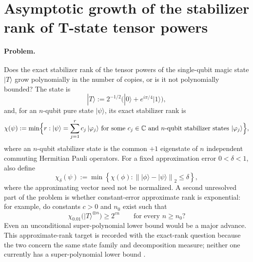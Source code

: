 \section{Asymptotic growth of the stabilizer rank of T-state tensor powers}
\label{sec:op_37f7b003ec78a028}

\paragraph{Problem.}
Does the exact stabilizer rank of the tensor powers of the single-qubit
magic state $|T\rangle$ grow polynomially in the number of copies, or is
it not polynomially bounded?  The state is
\begin{equation}
  |T\rangle := 2^{-1/2}\bigl(|0\rangle + e^{i\pi/4}|1\rangle\bigr),
  \label{eq:srtk-t-state}
\end{equation}
and, for an $n$-qubit pure state $|\psi\rangle$, its exact stabilizer rank
is
\begin{equation}
  \chi(\psi) := \min\Bigl\{r : |\psi\rangle = \sum_{j=1}^{r} c_j\,|\varphi_j\rangle
  \text{ for some } c_j \in \mathbb{C} \text{ and } n\text{-qubit stabilizer states }
  |\varphi_j\rangle\Bigr\},
  \label{eq:srtk-rank-def}
\end{equation}
where an $n$-qubit stabilizer state is the common $+1$ eigenstate of $n$
independent commuting Hermitian Pauli operators.  For a fixed approximation error $0<\delta<1$, also define
\begin{equation}
  \chi_\delta(\psi):=\min\left\{\chi(\phi):
  \left\lVert |\phi\rangle-|\psi\rangle\right\rVert_2\leq\delta\right\},
  \label{eq:srtk-approx-def}
\end{equation}
where the approximating vector need not be normalized. A second unresolved
part of the problem is whether constant-error approximate rank is
exponential: for example, do constants $c>0$ and $n_0$ exist such that
\begin{equation}
  \chi_{0.01}\bigl(|T\rangle^{\otimes n}\bigr)\geq 2^{cn}
  \qquad\text{for every }n\geq n_0?
  \label{eq:srtk-approx-exp}
\end{equation}
Even an unconditional super-polynomial lower bound would be a major advance.
This approximate-rank target is recorded with the exact-rank question because
the two concern the same state family and decomposition measure; neither one
currently has a super-polynomial lower bound
.

